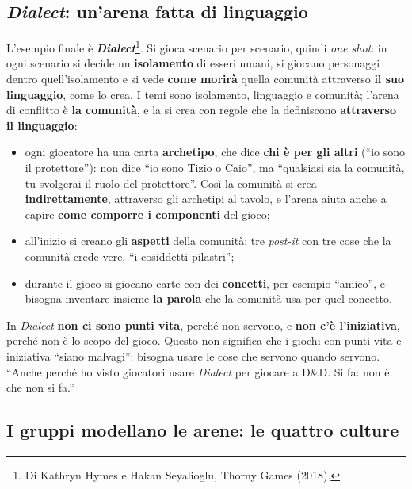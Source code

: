 \subsection{\emph{Dialect}: un'arena fatta di linguaggio}



L'esempio finale è \textbf{\emph{Dialect}}\footnote{Di Kathryn Hymes e Hakan Seyalioglu, Thorny
Games (2018).}. Si gioca scenario per scenario, quindi \emph{one shot}: in ogni scenario si decide
un \textbf{isolamento} di esseri umani, si giocano personaggi dentro quell'isolamento e si vede
\textbf{come morirà} quella comunità attraverso \textbf{il suo linguaggio}, come lo crea. I temi
sono isolamento, linguaggio e comunità; l'arena di conflitto è \textbf{la comunità}, e la si crea
con regole che la definiscono \textbf{attraverso il linguaggio}:
\begin{itemize}
  \item ogni giocatore ha una carta \textbf{archetipo}, che dice \textbf{chi è per gli altri}
        (``io sono il protettore''): non dice ``io sono Tizio o Caio'', ma ``qualsiasi sia la
        comunità, tu svolgerai il ruolo del protettore''. Così la comunità si crea
        \textbf{indirettamente}, attraverso gli archetipi al tavolo, e l'arena aiuta anche a capire
        \textbf{come comporre i componenti} del gioco;
  \item all'inizio si creano gli \textbf{aspetti} della comunità: tre \emph{post-it} con tre cose
        che la comunità crede vere, ``i cosiddetti pilastri'';
  \item durante il gioco si giocano carte con dei \textbf{concetti}, per esempio ``amico'', e
        bisogna inventare insieme \textbf{la parola} che la comunità usa per quel concetto.
\end{itemize}
In \emph{Dialect} \textbf{non ci sono punti vita}, perché non servono, e \textbf{non c'è
l'iniziativa}, perché non è lo scopo del gioco. Questo non significa che i giochi con punti vita e
iniziativa ``siano malvagi'': bisogna usare le cose che servono quando servono. ``Anche perché ho
visto giocatori usare \emph{Dialect} per giocare a D\&D. Si fa: non è che non si fa.''

\subsection{I gruppi modellano le arene: le quattro culture}

